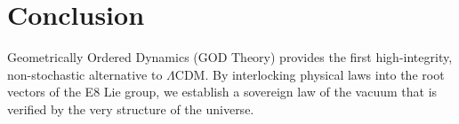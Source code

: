 \documentclass{article}
\begin{document}
\section{Conclusion}
Geometrically Ordered Dynamics (GOD Theory) provides the first high-integrity, non-stochastic alternative to $\Lambda$CDM. By interlocking physical laws into the root vectors of the E8 Lie group, we establish a sovereign law of the vacuum that is verified by the very structure of the universe.
\end{document}
